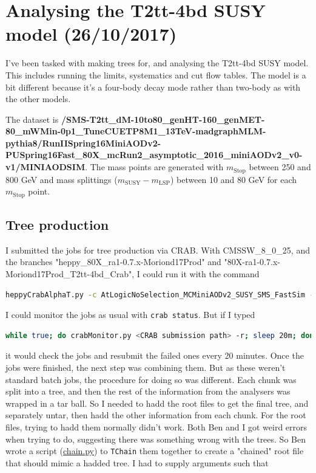 \newpage
\chapter{Analysing the T2tt-4bd SUSY model (26/10/2017)}

I've been tasked with making trees for, and analysing the T2tt-4bd SUSY model. This includes running the limits, systematics and cut flow tables. The model is a bit different because it's a four-body decay mode rather than two-body as with the other models.

The dataset is \textbf{/SMS-T2tt\_dM-10to80\_genHT-160\_genMET-80\_mWMin-0p1\_TuneCUETP8M1\_13TeV-madgraphMLM-pythia8/RunIISpring16MiniAODv2-PUSpring16Fast\_80X\_mcRun2\_asymptotic\_2016\_miniAODv2\_v0-v1/MINIAODSIM}. The mass points are generated with $m_{\mathrm{Stop}}$ between 250 and 800 GeV and mass splittings ($m_{\mathrm{SUSY}} - m_{\mathrm{LSP}}$) between 10 and 80 GeV for each $m_{\mathrm{Stop}}$ point.


\section{Tree production}

I submitted the jobs for tree production via CRAB. With CMSSW\_8\_0\_25, and the branches "heppy\_80X\_ra1-0.7.x-Moriond17Prod" and "80X-ra1-0.7.x-Moriond17Prod\_T2tt-4bd\_Crab", I could run it with the command

\begin{lstlisting}[belowskip=-0.7cm, language=sh, numbers=none]
heppyCrabAlphaT.py -c AtLogicNoSelection_MCMiniAODv2_SUSY_SMS_FastSim -d RA1 -s T2_UK_SGrid_Bristol
\end{lstlisting}

I could monitor the jobs as usual with \texttt{crab status}. But if I typed

\begin{lstlisting}[belowskip=-0.7cm, language=sh, numbers=none]
while true; do crabMonitor.py <CRAB submission path> -r; sleep 20m; done
\end{lstlisting}

it would check the jobs and resubmit the failed ones every 20 minutes. Once the jobs were finished, the next step was combining them. But as these weren't standard batch jobs, the procedure for doing so was different. Each chunk was split into a tree, and then the rest of the information from the analysers was wrapped in a tar ball. So I needed to hadd the root files to get the final tree, and separately untar, then hadd the other information from each chunk. For the root files, trying to hadd them normally didn't work. Both Ben and I got weird errors when trying to do, suggesting there was something wrong with the trees. So Ben wrote a script (\href{run:sec31/chain.py}{chain.py}) to \texttt{TChain} them together to create a "chained" root file that should mimic a hadded tree. I had to supply arguments such that

